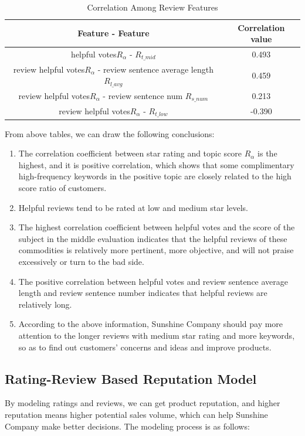\documentclass{mcmthesis}
\begin{document}
\begin{table}[H]
	\center
	\caption{Correlation Among Review Features}
	\label{type}
	\begin{tabular}{c|c}
		\hline
		\textbf{Feature - Feature} & \textbf{Correlation value} \\ \hline
		helpful votes$R_{\alpha}$ -   $R_{t\_{mid}}$               & 0.493                     \\ 
		review helpful votes$R_{\alpha}$ -  review sentence average length  $R_{l\_{avg}}$             & 0.459                    \\
		review helpful votes$R_{\alpha}$ -  review sentence num  $R_{s\_{num}}$              & 0.213                     \\ 
		review helpful votes$R_{\alpha}$ -  $R_{t\_{low}}$                & -0.390 	\\ \hline
	\end{tabular}
	\label{table2}
\end{table}
 
 From above tables, we can draw the following conclusions:
\begin{enumerate}
	\item The correlation coefficient between star rating and topic score $R_{\alpha}$ is the highest, and it is positive correlation, which shows that some complimentary high-frequency keywords in the positive topic are closely related to the high score ratio of customers. 
	\item Helpful reviews tend to be rated at low and medium star levels.
	\item The highest correlation coefficient between helpful votes and the score of the subject in the middle evaluation indicates that the helpful reviews of these commodities is relatively more pertinent, more objective, and will not praise excessively or turn to the bad side.
	\item The positive correlation between helpful votes and review sentence average length and review sentence number indicates that helpful reviews are relatively long.
	\item According to the above information, Sunshine Company should pay more attention to the longer reviews with medium star rating and more keywords, so as to find out customers' concerns and ideas and improve products.
\end{enumerate}
\subsection{Rating-Review Based Reputation Model}
\label{task_b}
By modeling ratings and reviews, we can get product reputation, and higher reputation means higher potential sales volume, which can help Sunshine Company make better decisions. The modeling process is as follows:
\end{document}
